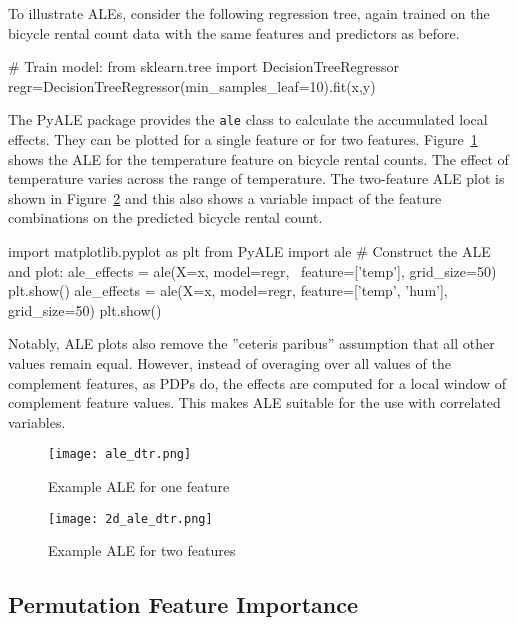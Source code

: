 To illustrate ALEs, consider the following regression tree, again trained on the bicycle rental count data with the same features and predictors as before.

\begin{pythoncode}
# Train model:
from sklearn.tree import DecisionTreeRegressor
regr=DecisionTreeRegressor(min_samples_leaf=10).fit(x,y)
\end{pythoncode}

The PyALE package provides the \texttt{ale} class to calculate the accumulated local effects. They can be plotted for a single feature or for two features. Figure~\ref{fig:ale1} shows the ALE for the temperature feature on bicycle rental counts. The effect of temperature varies across the range of temperature. The two-feature ALE plot is shown in Figure~\ref{fig:ale2} and this also shows a variable impact of the feature combinations on the predicted bicycle rental count. 

\begin{pythoncode}
import matplotlib.pyplot as plt
from PyALE import ale
# Construct the ALE and plot:
ale_effects = ale(X=x, model=regr, \
    feature=['temp'], grid_size=50)
plt.show()
ale_effects = ale(X=x, model=regr, 
    feature=['temp', 'hum'], grid_size=50)
plt.show()
\end{pythoncode}

Notably, ALE plots also remove the ''ceteris paribus'' assumption that all other values remain equal. However, instead of overaging over all values of the complement features, as PDPs do, the effects are computed for a local window of complement feature values. This makes ALE suitable for the use with correlated variables. 

\begin{figure}
\centering

\texttt{[image: ale\_dtr.png]} 
\caption{Example ALE for one feature}
\label{fig:ale1}
\end{figure}

\begin{figure}
\centering

\texttt{[image: 2d\_ale\_dtr.png]}
\caption{Example ALE for two features}
\label{fig:ale2}
\end{figure}

\FloatBarrier
\subsection{Permutation Feature Importance}

